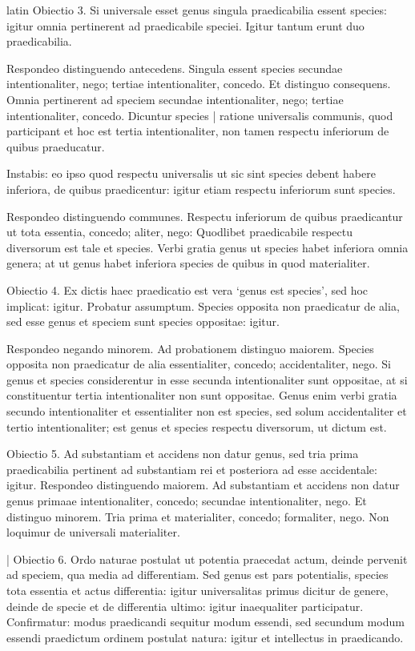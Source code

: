 \begin{otherlanguage*}{latin}
\pstart
Obiectio 3. Si universale esset genus singula praedicabilia essent species:
igitur omnia pertinerent ad praedicabile speciei. Igitur tantum erunt duo praedicabilia. 
\pend

\pstart
Respondeo distinguendo antecedens. Singula essent species secundae intentionaliter, nego; tertiae intentionaliter, concedo. Et distinguo consequens. Omnia pertinerent ad speciem secundae intentionaliter, nego; tertiae intentionaliter, concedo. Dicuntur species \textnormal{|} ratione universalis communis, quod participant et hoc est tertia intentionaliter, non tamen respectu inferiorum de quibus praeducatur. 
\pend

\pstart
Instabis:
eo ipso quod respectu universalis ut sic sint species debent habere inferiora, de quibus praedicentur:
igitur etiam respectu inferiorum sunt species. 
\pend

\pstart
Respondeo distinguendo communes. Respectu inferiorum de quibus praedicantur ut tota essentia, concedo; aliter, nego:
Quodlibet praedicabile respectu diversorum est tale et species. Verbi gratia genus ut species habet inferiora omnia genera; at ut genus habet inferiora species de quibus in quod materialiter. 
\pend

\pstart
Obiectio 4. Ex dictis haec praedicatio est vera `genus est species', sed hoc implicat:
igitur. Probatur assumptum. Species opposita non praedicatur de alia, sed esse genus et speciem sunt species oppositae:
igitur. 
\pend

\pstart
Respondeo negando minorem. Ad probationem distinguo maiorem. Species opposita non praedicatur de alia essentialiter, concedo; accidentaliter, nego. Si genus et species considerentur in esse secunda intentionaliter sunt oppositae, at si constituentur tertia intentionaliter non sunt oppositae. Genus enim verbi gratia secundo intentionaliter et essentialiter non est species, sed solum accidentaliter et tertio intentionaliter; est genus et species respectu diversorum, ut dictum est. 
\pend

\pstart
Obiectio 5. Ad substantiam et accidens non datur genus, sed tria prima praedicabilia pertinent ad substantiam rei et posteriora ad esse accidentale:
igitur. Respondeo distinguendo maiorem. Ad substantiam et accidens non datur genus primaae intentionaliter, concedo; secundae intentionaliter, nego. Et distinguo minorem. Tria prima et materialiter, concedo; formaliter, nego. Non loquimur de universali materialiter. 
\pend

\pstart
\textnormal{|} Obiectio 6. Ordo naturae postulat ut potentia praecedat actum, deinde pervenit ad speciem, qua media ad differentiam. Sed genus est pars potentialis, species tota essentia et actus differentia:
igitur universalitas primus dicitur de genere, deinde de specie et de differentia ultimo:
igitur inaequaliter participatur. Confirmatur:
modus praedicandi sequitur modum essendi, sed secundum modum essendi praedictum ordinem postulat natura:
igitur et intellectus in praedicando. 
\pend


\end{otherlanguage*}
